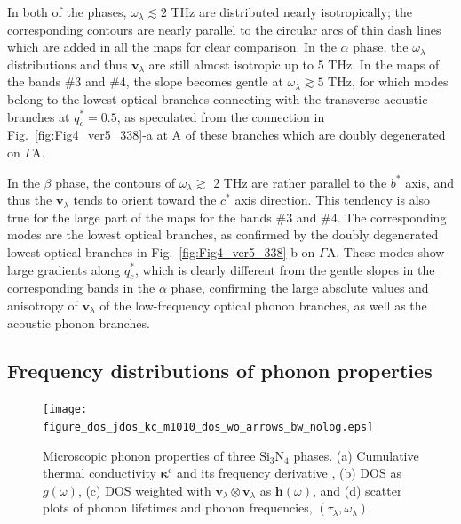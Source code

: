 \documentclass[twocolumn,amsmath,amssymb,a4paper,prb,superscriptaddress,floatfix]{revtex4-1}
\begin{document}
In both of the phases, $\omega_{\lambda} \lesssim 2$ THz are distributed nearly
isotropically; the corresponding contours are nearly parallel to the circular
arcs of thin dash lines which are added in all the maps for clear comparison.
In the $\alpha$ phase, the $\omega_{\lambda}$ distributions and thus
$\mathbf{v}_{\lambda}$ are still almost isotropic up to 5 THz. In the maps of
the bands \#3 and \#4, the slope becomes gentle at $\omega_\lambda \gtrsim 5$
THz, for which modes belong to the lowest optical branches connecting with the
transverse acoustic branches at $q_c^* = 0.5 $, as speculated from the
connection in Fig.~\ref{fig:Fig4_ver5_338}-a at A of these branches which are
doubly degenerated on $\Gamma$A. 

In the $\beta$ phase, the contours of $\omega_{\lambda} \gtrsim$ 2 THz are
rather parallel to the $b^*$ axis, and thus the $\mathbf{v}_{\lambda}$ tends to
orient toward the $c^*$ axis direction. This tendency is also true for the
large part of the maps for the bands \#3 and \#4. The corresponding modes are
the lowest optical branches, as confirmed by the doubly degenerated lowest
optical branches in Fig.~\ref{fig:Fig4_ver5_338}-b on $\Gamma$A. These modes
show large gradients along $q_c^*$, which is clearly different from the gentle
slopes in the corresponding bands in the $\alpha$ phase, confirming the large
absolute values and anisotropy of $\mathbf{v}_{\lambda}$ of the low-frequency
optical phonon branches, as well as the acoustic phonon branches.


\subsection{Frequency distributions of phonon properties}

\begin{figure}[ht]
 \begin{center}
	 \texttt{[image: figure\_dos\_jdos\_kc\_m1010\_dos\_wo\_arrows\_bw\_nolog.eps]}
  \caption{Microscopic phonon properties of three Si$_3$N$_4$
	  phases. (a) Cumulative thermal conductivity $\boldsymbol{\kappa}^\text{c}$ and
	  its frequency derivative
	  , (b) DOS as $g(\omega)$, (c) DOS weighted with $\mathbf{v}_\lambda \otimes
	  \mathbf{v}_\lambda$ as $\boldsymbol{h}(\omega)$, and (d) scatter plots of phonon
	  lifetimes and phonon frequencies, $(\tau_\lambda,\omega_\lambda)$.
  \label{fig:Fig5_338_rev} }
 \end{center}
\end{figure}
\end{document}
